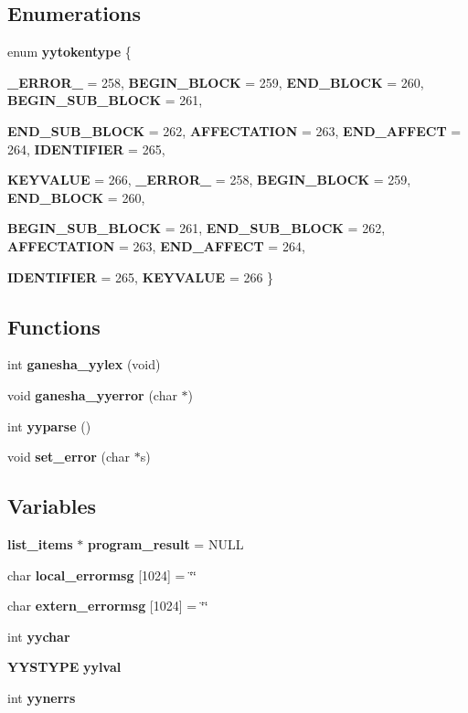 \subsection*{Enumerations}
\begin{DoxyCompactItemize}
\item 
enum {\bf yytokentype} \{ \par
{\bf \_\-ERROR\_\-} =  258, 
{\bf BEGIN\_\-BLOCK} =  259, 
{\bf END\_\-BLOCK} =  260, 
{\bf BEGIN\_\-SUB\_\-BLOCK} =  261, 
\par
{\bf END\_\-SUB\_\-BLOCK} =  262, 
{\bf AFFECTATION} =  263, 
{\bf END\_\-AFFECT} =  264, 
{\bf IDENTIFIER} =  265, 
\par
{\bf KEYVALUE} =  266, 
{\bf \_\-ERROR\_\-} =  258, 
{\bf BEGIN\_\-BLOCK} =  259, 
{\bf END\_\-BLOCK} =  260, 
\par
{\bf BEGIN\_\-SUB\_\-BLOCK} =  261, 
{\bf END\_\-SUB\_\-BLOCK} =  262, 
{\bf AFFECTATION} =  263, 
{\bf END\_\-AFFECT} =  264, 
\par
{\bf IDENTIFIER} =  265, 
{\bf KEYVALUE} =  266
 \}
\end{DoxyCompactItemize}
\subsection*{Functions}
\begin{DoxyCompactItemize}
\item 
int {\bf ganesha\_\-yylex} (void)
\item 
void {\bf ganesha\_\-yyerror} (char $\ast$)
\item 
int {\bf yyparse} ()
\item 
void {\bf set\_\-error} (char $\ast$s)
\end{DoxyCompactItemize}
\subsection*{Variables}
\begin{DoxyCompactItemize}
\item 
{\bf list\_\-items} $\ast$ {\bf program\_\-result} = NULL
\item 
char {\bf local\_\-errormsg} [1024] = \char`\"{}\char`\"{}
\item 
char {\bf extern\_\-errormsg} [1024] = \char`\"{}\char`\"{}
\item 
int {\bf yychar}
\item 
{\bf YYSTYPE} {\bf yylval}
\item 
int {\bf yynerrs}
\end{DoxyCompactItemize}


